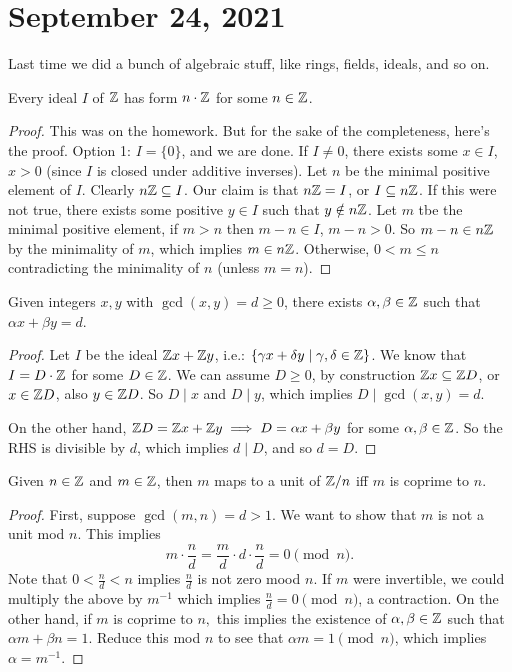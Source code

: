 \section{September 24, 2021} 
Last time we did a bunch of algebraic stuff, like rings, fields, ideals, and so on.
\begin{lemma}
   Every ideal $I$ of $\mathbb{Z}$ has form $n \cdot \mathbb{Z}$ for some $n \in \mathbb{Z}$.
\end{lemma}
\begin{proof}
    This was on the homework. But for the sake of the completeness, here's the proof. Option 1: $I= \{0\} $, and we are done. If $I\neq 0$, there exists some $x \in I$, $x>0$ (since $I$ is closed under additive inverses). Let $n$ be the minimal positive element of $I$. Clearly $n \mathbb{Z} \subseteq I$. Our claim is that $n\mathbb{Z} =I$, or $I \subseteq n\mathbb{Z}$. If this were not true, there exists some positive $y \in I$ such that $y \notin n\mathbb{Z}$. Let $m $ tbe the minimal positive element, if $m>n$ then $m-n \in I$, $m-n >0$. So $m-n \in  n \mathbb{Z}$ by the minimality of $ m$, which implies $m \in  n\mathbb{Z}$. Otherwise, $0 < m \leq n$ contradicting the minimality of $n$ (unless $m=n$).
\end{proof}
\begin{cor}
    Given integers $x,y $ with $\gcd(x,y)=d \geq 0$, there exists $\alpha ,\beta  \in \mathbb{Z}$ such that $\alpha x+\beta y=d$.
\end{cor}
\begin{proof}
    Let $I$ be the ideal $\mathbb{Z} x+ \mathbb{Z} y$, i.e.: $\{ \gamma  x + \delta  y \mid \gamma ,\delta \in \mathbb{Z} \} $. We know that $I= D \cdot \mathbb{Z}$ for some $D \in \mathbb{Z}$. We can assume $D \geq 0$, by construction $\mathbb{Z} x \subseteq \mathbb{Z} D$, or $x \in \mathbb{Z} D$, also $y \in \mathbb{Z} D$. So $D \mid x $ and $D \mid y$, which implies $D \mid  \gcd(x,y)=d$.
     
    On the other hand, $\mathbb{Z} D = \mathbb{Z} x+\mathbb{Z} y \implies D=\alpha x+\beta y$ for some $\alpha ,\beta  \in \mathbb{Z}$. So the RHS is divisible by $d$, which implies $d \mid D$, and so $d = D$.
\end{proof}
\begin{cor}
    Given $n \in  \mathbb{Z}$ and $m \in \mathbb{Z}$, then $m $ maps to a unit of $\mathbb{Z} /n$ iff $m$ is coprime to $n$.
\end{cor}
\begin{proof}
    First, suppose $\gcd(m,n)=d >1$. We want to show that $m$ is not a unit mod $n$. This implies \[
    m \cdot  \frac{n}{d}= \frac{m}{d}\cdot  d \cdot  \frac{n}{d}=0\pmod n.
    \] Note that $0 < \frac{n}{d}<n$ implies $\frac{n}{d}$ is not zero mood  $n$. If $m$ were invertible, we could multiply the above by $ m ^{-1} $ which implies $\frac{n}{d}=0 \pmod n$, a contraction. On the other hand, if $m$ is coprime to $n,$  this implies the existence of $\alpha ,\beta  \in \mathbb{Z}$ such that $\alpha m+\beta n =1$. Reduce this mod $n$ to see that $\alpha  m= 1\pmod n$, which implies $\alpha =m ^{-1}$.
\end{proof}
